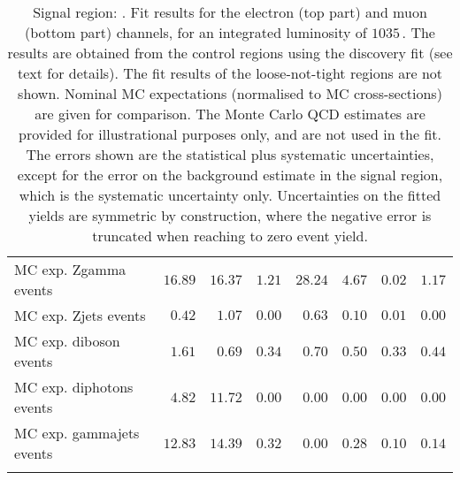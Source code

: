 \begin{table}
\begin{center}
{\begin{tabular*}{\textwidth}{@{\extracolsep{\fill}}lrrrrrrr}
        MC exp. Zgamma events         & $16.89$          & $16.37$          & $1.21$          & $28.24$          & $4.67$          & $0.02$          & $1.17$              \\
        MC exp. Zjets events         & $0.42$          & $1.07$          & $0.00$          & $0.63$          & $0.10$          & $0.01$          & $0.00$              \\
        MC exp. diboson events         & $1.61$          & $0.69$          & $0.34$          & $0.70$          & $0.50$          & $0.33$          & $0.44$              \\
        MC exp. diphotons events         & $4.82$          & $11.72$          & $0.00$          & $0.00$          & $0.00$          & $0.00$          & $0.00$              \\
        MC exp. gammajets events         & $12.83$          & $14.39$          & $0.32$          & $0.00$          & $0.28$          & $0.10$          & $0.14$              \\
\noalign{\smallskip}\hline\noalign{\smallskip}
\end{tabular*}
}
\end{center}
\caption{Signal region: . Fit results for the electron (top part) and muon (bottom part) channels, for an integrated luminosity of $1035$\,\ipb.
The results are obtained from the control regions using the discovery fit (see text for details). The fit results of the loose-not-tight regions are not shown.
Nominal MC expectations (normalised to MC cross-sections) are given for comparison. 
The Monte Carlo QCD estimates are provided for illustrational purposes only, and are not used in the fit.
The errors shown are the statistical plus systematic uncertainties, except for the error on the background estimate in the signal region, which is the systematic uncertainty only.
Uncertainties on the fitted yields are symmetric by construction, 
where the negative error is truncated when reaching to zero event yield.
}
\label{table.results.systematics.in.logL.fit.table.results.yields}
\end{table}
%